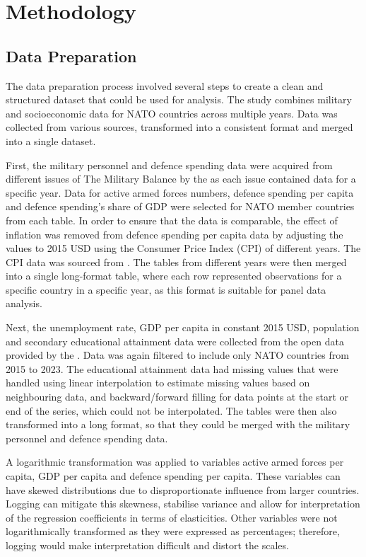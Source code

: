 \chapter{Methodology}

\section{Data Preparation}

The data preparation process involved several steps to create a clean and structured 
dataset that could be used for analysis. The study combines military and socioeconomic 
data for NATO countries across multiple years. Data was collected from various sources,
transformed into a consistent format and merged into a single dataset.

First, the military personnel and defence 
spending data were acquired from different issues of The Military Balance by the 
\textcite{noauthor_military_balance_nodate} 
as each issue contained data for a specific year. Data for active armed forces numbers, 
defence spending per capita and defence spending's share of GDP were
selected for NATO member countries from each table.
In order to ensure that the data is comparable, the effect of inflation was removed 
from defence spending per capita data by adjusting the values to 2015 USD using the Consumer Price 
Index (CPI) of different years. The CPI data was sourced from \textcite{federal_reserve_bank_of_minneapolis_consumer_nodate}. 
The tables from different years were then merged into a single long-format table, where
each row represented observations for a specific country in a specific year, as this format is 
suitable for panel data analysis.

Next, the unemployment rate, GDP per capita in constant 2015 USD, population and 
secondary educational attainment data were collected from the open data provided by the
\textcite{noauthor_world_bank_nodate}. Data was again filtered to include 
only NATO countries from 2015 to 2023. 
The educational attainment 
data had missing values that were handled using linear interpolation to estimate missing values 
based on neighbouring data, and backward/forward filling for data points at the start or end 
of the series, which could not be interpolated. The tables were then also transformed into a long format, 
so that they could be 
merged with the military personnel and defence spending data.

A logarithmic transformation was applied to variables active armed forces per capita, GDP per capita 
and defence spending per capita. These variables can have skewed distributions due to disproportionate influence 
from larger countries. 
Logging can mitigate this skewness, stabilise variance and allow for interpretation of the regression 
coefficients in terms of elasticities. Other variables were not logarithmically transformed as they were 
expressed as percentages; therefore, logging would make interpretation difficult and distort the scales.

